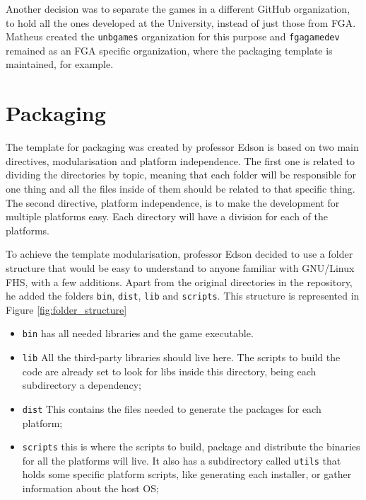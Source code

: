 Another decision was to separate the games in a different GitHub organization, to hold all the ones developed at the University, instead of just those from FGA. Matheus created the \texttt{unbgames} organization for this purpose and \texttt{fgagamedev} remained as an FGA specific organization, where the packaging template is maintained, for example.

\section{Packaging}
\label{sec:packaging}

The template for packaging was created by professor Edson is based on two main directives, modularisation and platform independence. The first one is related to dividing the directories by topic, meaning that each folder will be responsible for one thing and all the files inside of them should be related to that specific thing. The second directive, platform independence, is to make the development for multiple platforms easy. Each directory will have a division for each of the platforms.

To achieve the template modularisation, professor Edson decided to use a folder structure that would be easy to understand to anyone familiar with GNU/Linux FHS, with a few additions. Apart from the original directories in the repository, he added the folders \texttt{bin}, \texttt{dist}, \texttt{lib} and \texttt{scripts}. This structure is represented in Figure \ref{fig:folder_structure}

\begin{itemize}

\item \texttt{bin} has all needed libraries and the game executable.
\item \texttt{lib} All the third-party libraries should live here. The scripts to build the code are already set to look for libs inside this directory, being each subdirectory a dependency;
\item \texttt{dist} This contains the files needed to generate the packages for each platform;
\item \texttt{scripts} this is where the scripts to build, package and distribute the binaries for all the platforms will live. It also has a subdirectory called \texttt{utils} that holds some specific platform scripts, like generating each installer, or gather information about the host OS;
\end{itemize}

